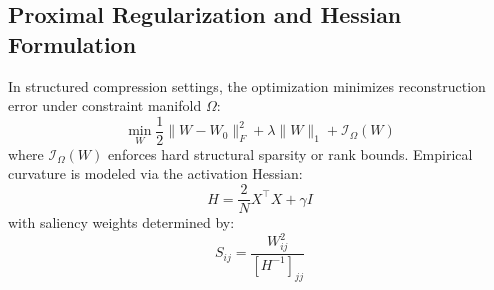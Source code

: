 \subsection{Proximal Regularization and Hessian Formulation}
In structured compression settings, the optimization minimizes reconstruction error under constraint manifold $\Omega$:
\[
\min_{W} \frac{1}{2} \|W - W_0\|_F^2 + \lambda \|W\|_1 + \mathcal{I}_{\Omega}(W)
\]
where $\mathcal{I}_{\Omega}(W)$ enforces hard structural sparsity or rank bounds. Empirical curvature is modeled via the activation Hessian:
\[
H = \frac{2}{N} X^\top X + \gamma I
\]
with saliency weights determined by:
\[
S_{ij} = \frac{W_{ij}^2}{[H^{-1}]_{jj}}
\]
